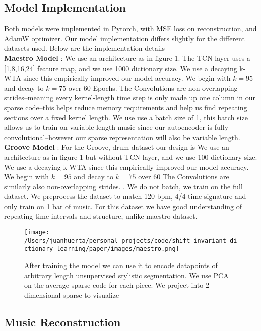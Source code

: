 \documentclass[11pt,a4paper]{article}
\begin{document}
\subsection{Model Implementation}
Both models were implemented in Pytorch, with MSE loss on reconstruction, and AdamW optimizer. Our model implementation differs slightly for the different datasets used. Below are the implementation details
 \\
\textbf{Maestro Model} : We use an architecture as in figure 1. The TCN layer uses a [1,8,16,24] feature map, and we use 1000 dictionary size. We use a decaying k-WTA since this empirically improved our model accuracy. We begin with $k=95$ and decay to $k=75$ over $60$ Epochs. The Convolutions are non-overlapping strides--meaning every kernel-length time step is only made up one column in our sparse code--this helps reduce memory requirements and help us find repeating sections over a fixed kernel length. We use use a batch size of 1, this batch size allows us to train on variable length music since our autoencoder is fully convolutional--however our sparse representation will also be variable length. \\
\textbf{Groove Model}  : For the Groove, drum dataset our design is We use an architecture as in figure 1 but without TCN layer, and we use 100 dictionary size. We use a decaying k-WTA since this empirically improved our model accuracy. We begin with $k=95$ and decay to $k=75$ over $60$ The Convolutions are similarly also non-overlapping strides. . We do not batch, we train on the full dataset. We  preprocess the dataset to match 120 bpm, 4/4 time signature and only train on 1 bar of music.  For this dataset we have good understanding of repeating time intervals and structure, unlike maestro dataset. 


\begin{figure*}[ht]
  \texttt{[image: /Users/juanhuerta/personal\_projects/code/shift\_invariant\_dictionary\_learning/paper/images/maestro.png]}
  \caption{After training the model we can use it to encode datapoints of arbitrary length unsupervised stylistic segmentation. We use PCA on the average sparse code for each piece. We project into 2 dimensional sparse to visualize }
  \label{fig:boat1}
\end{figure*}


\subsection{Music Reconstruction}
\label{ssec:first}
\end{document}
